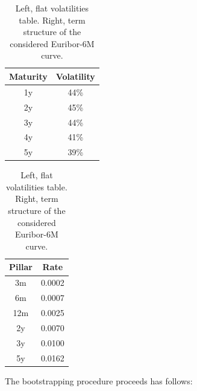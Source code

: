 \documentclass[12pt,a4paper]{article}
\begin{document}
\begin{table}[htpb]
\begin{center}
\renewcommand{\arraystretch}{2}
\begin{tabular}{|c|c|}
\hline
Maturity & Volatility \\ \hline
1y & 44\% \\ \hline
2y & 45\% \\ \hline
3y & 44\% \\ \hline
4y & 41\% \\ \hline
5y & 39\% \\ \hline
\end{tabular}
\quad
\begin{tabular}{|c|c|}
\hline
Pillar & Rate \\ \hline
3m & 0.0002 \\ \hline
6m & 0.0007 \\ \hline
12m & 0.0025 \\ \hline
2y  & 0.0070 \\ \hline
3y & 0.0100 \\ \hline
5y & 0.0162 \\ \hline
\end{tabular}
\end{center}
\label{tab:flat_volatilities}
\caption{Left, flat volatilities table. Right, term structure of the considered Euribor-6M curve.}
\end{table}
The bootstrapping procedure proceeds has follows:
\end{document}

